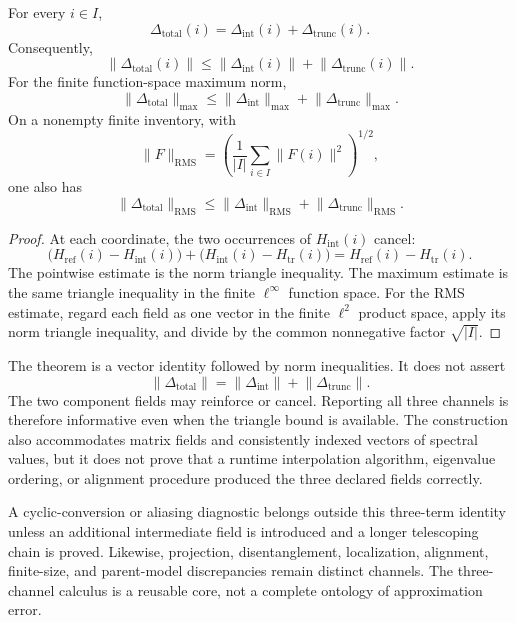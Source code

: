 \begin{theorem}
\label{thm:three-channel-residual-calculus}
For every $i\in I$,
\[
  \Delta_{\mathrm{total}}(i)
  =\Delta_{\mathrm{int}}(i)+\Delta_{\mathrm{trunc}}(i).
\]
Consequently,
\[
  \lVert\Delta_{\mathrm{total}}(i)\rVert
  \leq
  \lVert\Delta_{\mathrm{int}}(i)\rVert
  +\lVert\Delta_{\mathrm{trunc}}(i)\rVert.
\]
For the finite function-space maximum norm,
\[
  \lVert\Delta_{\mathrm{total}}\rVert_{\max}
  \leq
  \lVert\Delta_{\mathrm{int}}\rVert_{\max}
  +\lVert\Delta_{\mathrm{trunc}}\rVert_{\max}.
\]
On a nonempty finite inventory, with
\[
  \lVert F\rVert_{\mathrm{RMS}}
  =\left(\frac1{|I|}\sum_{i\in I}\lVert F(i)\rVert^2\right)^{1/2},
\]
one also has
\[
  \lVert\Delta_{\mathrm{total}}\rVert_{\mathrm{RMS}}
  \leq
  \lVert\Delta_{\mathrm{int}}\rVert_{\mathrm{RMS}}
  +\lVert\Delta_{\mathrm{trunc}}\rVert_{\mathrm{RMS}}.
\]
\end{theorem}

\begin{proof}
At each coordinate, the two occurrences of $H_{\mathrm{int}}(i)$ cancel:
\[
  \bigl(H_{\mathrm{ref}}(i)-H_{\mathrm{int}}(i)\bigr)
  +\bigl(H_{\mathrm{int}}(i)-H_{\mathrm{tr}}(i)\bigr)
  =H_{\mathrm{ref}}(i)-H_{\mathrm{tr}}(i).
\]
The pointwise estimate is the norm triangle inequality.  The maximum estimate is the
same triangle inequality in the finite $\ell^\infty$ function space.  For the RMS
estimate, regard each field as one vector in the finite $\ell^2$ product space, apply
its norm triangle inequality, and divide by the common nonnegative factor
$\sqrt{|I|}$.
\end{proof}

The theorem is a vector identity followed by norm inequalities.  It does not assert
\[
  \lVert\Delta_{\mathrm{total}}\rVert
  =\lVert\Delta_{\mathrm{int}}\rVert
   +\lVert\Delta_{\mathrm{trunc}}\rVert.
\]
The two component fields may reinforce or cancel.  Reporting all three channels is
therefore informative even when the triangle bound is available.  The construction
also accommodates matrix fields and consistently indexed vectors of spectral values,
but it does not prove that a runtime interpolation algorithm, eigenvalue ordering, or
alignment procedure produced the three declared fields correctly.

A cyclic-conversion or aliasing diagnostic belongs outside this three-term identity
unless an additional intermediate field is introduced and a longer telescoping chain is
proved.  Likewise, projection, disentanglement, localization, alignment, finite-size,
and parent-model discrepancies remain distinct channels.  The three-channel calculus
is a reusable core, not a complete ontology of approximation error.

